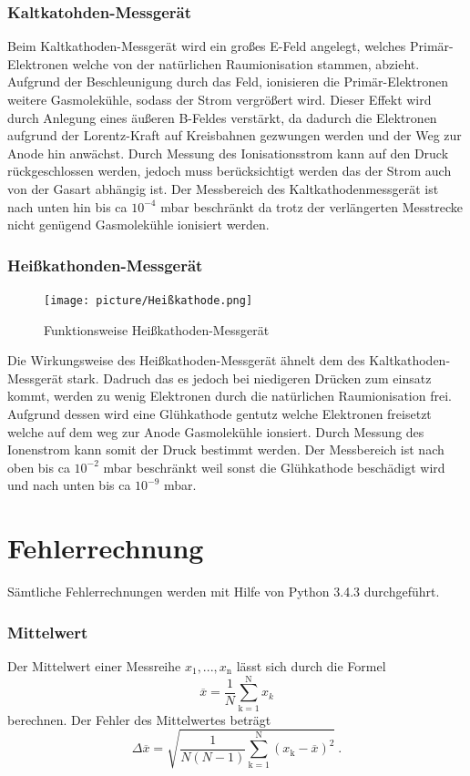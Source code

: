 \subsubsection{Kaltkatohden-Messgerät}
Beim Kaltkathoden-Messgerät wird ein großes E-Feld angelegt, welches Primär-Elektronen welche von der natürlichen Raumionisation stammen, abzieht. Aufgrund der Beschleunigung durch das Feld, ionisieren die Primär-Elektronen weitere Gasmolekühle, sodass der Strom vergrößert wird. Dieser Effekt wird durch Anlegung eines äußeren B-Feldes verstärkt, da dadurch die Elektronen aufgrund der Lorentz-Kraft auf Kreisbahnen gezwungen werden und der Weg zur Anode hin anwächst. Durch Messung des Ionisationsstrom kann auf den Druck rückgeschlossen werden, jedoch muss berücksichtigt werden das der Strom auch von der Gasart abhängig ist. Der Messbereich des Kaltkathodenmessgerät ist nach unten hin bis ca $10^{-4}$ mbar beschränkt da trotz der verlängerten Messtrecke nicht genügend Gasmolekühle ionisiert werden.

\subsubsection{Heißkathonden-Messgerät}
\begin{figure}
  \vspace{-1.0cm}
  \centering
  \texttt{[image: picture/Heißkathode.png]}
  \caption{Funktionsweise Heißkathoden-Messgerät \cite{Heiss}}
  \label{fig:Heißkathode}
  \vspace{-1cm}
\end{figure}
Die Wirkungsweise des Heißkathoden-Messgerät ähnelt dem des Kaltkathoden-Messgerät stark. Dadruch das es jedoch bei niedigeren Drücken zum einsatz kommt, werden zu wenig Elektronen durch die natürlichen Raumionisation frei. Aufgrund dessen wird eine Glühkathode gentutz welche Elektronen freisetzt welche auf dem weg zur Anode Gasmolekühle ionsiert. Durch Messung des Ionenstrom kann somit der Druck bestimmt werden. Der Messbereich ist nach oben bis ca $10^{-2}$ mbar beschränkt weil sonst die Glühkathode beschädigt wird und nach unten bis ca $10^{-9}$ mbar.
\section{Fehlerrechnung}
Sämtliche Fehlerrechnungen werden mit Hilfe von Python 3.4.3 durchgeführt.
\subsubsection{Mittelwert}
Der Mittelwert einer Messreihe $x_\text{1}, ... ,x_\text{n}$ lässt sich durch die Formel
\begin{equation}
	\overline{x} = \frac{1}{N} \sum_{\text{k}=1}^\text{N} x_k
	\label{eqn:ave}
\end{equation}
berechnen. Der Fehler des Mittelwertes beträgt
\begin{equation}
	\Delta \overline{x} = \sqrt{ \frac{1}{N(N-1)} \sum_{\text{k}=1}^\text{N} (x_\text{k} - \overline{x})^2} \ .
	\label{eqn:std}
\end{equation}


